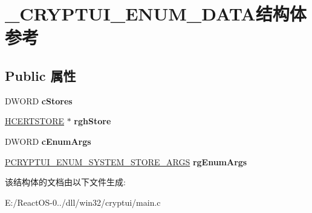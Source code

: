 \hypertarget{struct___c_r_y_p_t_u_i___e_n_u_m___d_a_t_a}{}\section{\+\_\+\+C\+R\+Y\+P\+T\+U\+I\+\_\+\+E\+N\+U\+M\+\_\+\+D\+A\+T\+A结构体 参考}
\label{struct___c_r_y_p_t_u_i___e_n_u_m___d_a_t_a}
\subsection*{Public 属性}
\begin{DoxyCompactItemize}
\item 
\mbox{\label{struct___c_r_y_p_t_u_i___e_n_u_m___d_a_t_a_a13a4799455e24af600c1bf4627f9f1a0}} 
D\+W\+O\+RD {\bfseries c\+Stores}
\item 
\mbox{\label{struct___c_r_y_p_t_u_i___e_n_u_m___d_a_t_a_ac75d105914d6ad7e5f1599ebda81c33b}} 
\hyperlink{interfacevoid}{H\+C\+E\+R\+T\+S\+T\+O\+RE} $\ast$ {\bfseries rgh\+Store}
\item 
\mbox{\label{struct___c_r_y_p_t_u_i___e_n_u_m___d_a_t_a_a570c7283139e5422ee38cd1aef56f421}} 
D\+W\+O\+RD {\bfseries c\+Enum\+Args}
\item 
\mbox{\label{struct___c_r_y_p_t_u_i___e_n_u_m___d_a_t_a_a534fe926f3a08a9f8b0e205ebb7589b8}} 
\hyperlink{struct___c_r_y_p_t_u_i___e_n_u_m___s_y_s_t_e_m___s_t_o_r_e___a_r_g_s}{P\+C\+R\+Y\+P\+T\+U\+I\+\_\+\+E\+N\+U\+M\+\_\+\+S\+Y\+S\+T\+E\+M\+\_\+\+S\+T\+O\+R\+E\+\_\+\+A\+R\+GS} {\bfseries rg\+Enum\+Args}
\end{DoxyCompactItemize}


该结构体的文档由以下文件生成\+:\begin{DoxyCompactItemize}
\item 
E\+:/\+React\+O\+S-\/0../dll/win32/cryptui/main.\+c\end{DoxyCompactItemize}
